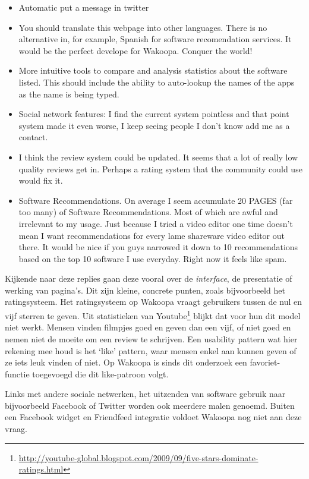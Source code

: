 \documentclass[a4paper, 10pt, pdftex]{report}
\begin{document}
      \begin{itemize}
      \item Automatic put a message in twitter
      \item You should translate this webpage into other languages. There is no alternative in, for example, Spanish for software recomendation services. It would be the perfect develope for Wakoopa. Conquer the world!
      \item More intuitive tools to compare and analysis statistics about the software listed. This should include the ability to auto-lookup the names of the apps as the name is being typed.
      \item Social network features: I find the current system pointless and that point system made it even worse, I keep seeing people I don't know add me as a contact.
      \item I think the review system could be updated. It seems that a lot of really low quality reviews get in. Perhaps a rating system that the community could use would fix it.
      \item Software Recommendations. On average I seem accumulate 20 PAGES (far too many) of Software Recommendations. Most of which are awful and irrelevant to my usage. Just because I tried a video editor one time doesn't mean I want recommendations for every lame shareware video editor out there. It would be nice if you guys narrowed it down to 10 recommendations based on the top 10 software I use everyday. Right now it feels like spam.
      \end{itemize}

      Kijkende naar deze replies gaan deze vooral over de \emph{interface}, de presentatie of werking van pagina's. Dit zijn kleine, concrete punten, zoals bijvoorbeeld het ratingsysteem. Het ratingsysteem op Wakoopa vraagt gebruikers tussen de nul en vijf sterren te geven. Uit statistieken van Youtube\footnote{\url{http://youtube-global.blogspot.com/2009/09/five-stars-dominate-ratings.html}} blijkt dat voor hun dit model niet werkt. Mensen vinden filmpjes goed en geven dan een vijf, of niet goed en nemen niet de moeite om een review te schrijven. Een usability pattern wat hier rekening mee houd is het `like' pattern, waar mensen enkel aan kunnen geven of ze iets leuk vinden of niet. Op Wakoopa is sinds dit onderzoek een favoriet-functie toegevoegd die dit like-patroon volgt.

      Links met andere sociale netwerken, het uitzenden van software gebruik naar bijvoorbeeld Facebook of Twitter worden ook meerdere malen genoemd. Buiten een Facebook widget en Friendfeed integratie voldoet Wakoopa nog niet aan deze vraag.
\end{document}

